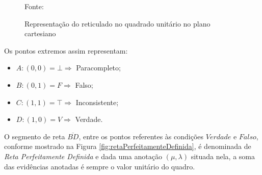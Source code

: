 \begin{figure}[!h]
\centering
\caption{Representação do reticulado no quadrado unitário no plano cartesiano}
\label{fig:reticuladoQUPC}

{\small Fonte: \cite{JoaoInacio} }
\end{figure}







Os pontos extremos assim representam:

\begin{itemize}
\item $A: (0,0) = \bot \Rightarrow $ Paracompleto;
\item $B: (0,1) = F \Rightarrow $ Falso;
\item $C: (1,1) = \top \Rightarrow $ Inconsistente;
\item $D: (1,0) = V \Rightarrow $ Verdade.
\end{itemize}

O segmento de reta $\overline{BD}$, entre os pontos referentes às condições $Verdade$ e $Falso$, conforme mostrado na Figura \ref{fig:retaPerfeitamenteDefinida}, é denominada de \emph{Reta Perfeitamente Definida} e dada uma anotação $(\mu, \lambda )$ situada nela, a soma das evidências anotadas é sempre o valor unitário do quadro. 

